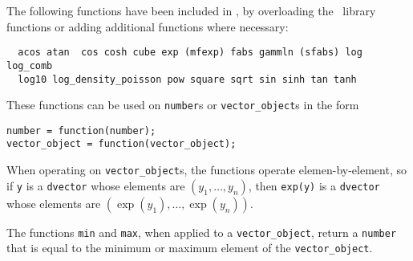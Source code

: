  The following functions have been included in \scAD, by overloading the 
\cplus\ library functions or adding additional functions where necessary:
\begin{lstlisting}
  acos atan  cos cosh cube exp (mfexp) fabs gammln (sfabs) log log_comb 
  log10 log_density_poisson pow square sqrt sin sinh tan tanh
\end{lstlisting}
       
      
   
   
   
   
   
   
These functions can be used on \texttt{number}s or \texttt{vector\_object}s
in the form
\begin{lstlisting}
number = function(number);
vector_object = function(vector_object);
\end{lstlisting}
When operating on \texttt{vector\_object}s, the functions operate  
elemen-by-element, so if \texttt{y} is a \texttt{dvector} whose
elements are $(y_1,\ldots,y_n)$, then \texttt{exp(y)} is a 
\texttt{dvector} whose elements are $(\exp(y_1),\ldots,\exp(y_n))$.

The functions \texttt{min} and \texttt{max}, when applied to a \texttt{vector\_object},
return a \texttt{number} that is equal to the minimum or maximum element of the
\texttt{vector\_object}.

